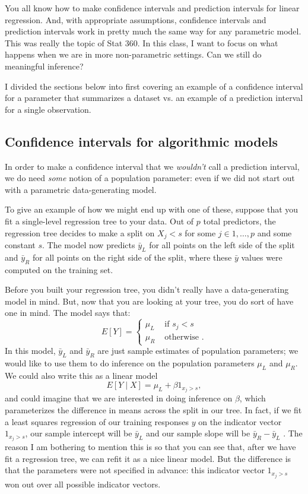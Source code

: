 You all know how to make confidence intervals and prediction intervals for linear regression. And, with appropriate assumptions, confidence intervals and prediction intervals work in pretty much the same way for any parametric model. This was really the topic of Stat 360. In this class, I want to focus on what happens when we are in more non-parametric settings. Can we still do meaningful inference?

I divided the sections below into first covering an example of a confidence interval for a parameter that summarizes a dataset vs. an example of a prediction interval for a single observation. 

\subsection{Confidence intervals for algorithmic models}

In order to make a confidence interval that we \emph{wouldn't} call a prediction interval, we do need \emph{some} notion of a population parameter: even if we did not start out with a parametric data-generating model.

To give an example of how we might end up with one of these, suppose that you fit a single-level regression tree to your data. Out of $p$ total predictors, the regression tree decides to make a split on $X_j < s$ for some $j \in 1,\ldots,p$ and some constant $s$. The model now predicts $\bar{y}_L$ for all points on the left side of the split and $\bar{y}_R$ for all points on the right side of the split, where these $\bar{y}$ values were computed on the training set.

Before you built your regression tree, you didn't really have a data-generating model in mind. But, now that you are looking at your tree, you do sort of have one in mind. The model says that: 
$$
E[Y] = 
\begin{cases}
\mu_L & \text{ if } s_j < s \\
\mu_R & \text{ otherwise }. 
\end{cases}
$$
In this model, $\bar{y}_L$ and $\bar{y}_R$ are just sample estimates of population parameters; we would like to use them to do inference on the population parameters $\mu_L$ and $\mu_R$. We could also write this as a linear model
$$
E[Y \mid X] = \mu_L + \beta 1_{x_j > s},
$$
and could imagine that we are interested in doing inference on $\beta$, which parameterizes the difference in means across the split in our tree. In fact, if we fit a least squares regression of our training responses $y$ on the indicator vector $ 1_{x_j > s}$, our sample intercept will be $\bar{y}_L$ and our sample slope will be $\bar{y}_R-\bar{y}_L$ . The reason I am bothering to mention this is so that you can see that, after we have fit a regression tree, we can refit it as a nice linear model. But the difference is that the parameters were not specified in advance: this indicator vector $ 1_{x_j > s}$ won out over all possible indicator vectors. 

